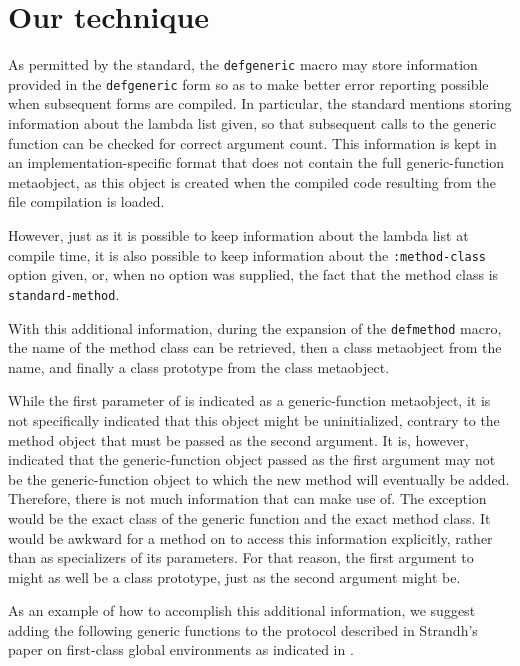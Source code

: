 \section{Our technique}

As permitted by the \commonlisp{} standard, the \texttt{defgeneric}
macro may store information provided in the \texttt{defgeneric} form
so as to make better error reporting possible when subsequent forms
are compiled.  In particular, the standard mentions storing
information about the lambda list given, so that subsequent calls to
the generic function can be checked for correct argument count.
This information is kept in an implementation-specific format that
does not contain the full generic-function metaobject, as this object
is created when the compiled code resulting from the file compilation
is loaded.

However, just as it is possible to keep information about the lambda
list at compile time, it is also possible to keep information about
the \texttt{:method-class} option given, or, when no option was
supplied, the fact that the method class is \texttt{standard-method}.

With this additional information, during the expansion of the
\texttt{defmethod} macro, the name of the method class can be
retrieved, then a class metaobject from the name, and finally a class
prototype from the class metaobject. 

While the first parameter of \mml{} is indicated as a generic-function
metaobject, it is not specifically indicated that this object might be
uninitialized, contrary to the method object that must be passed as
the second argument.  It is, however, indicated that the
generic-function object passed as the first argument may not be the
generic-function object to which the new method will eventually be
added.  Therefore, there is not much information that \mml{} can make
use of.  The exception would be the exact class of the generic
function and the exact method class.  It would be awkward for a method
on \mml{} to access this information explicitly, rather than as
specializers of its parameters.  For that reason, the first argument
to \mml{} might as well be a class prototype, just as the second
argument might be.

As an example of how to accomplish this additional information, we
suggest adding the following generic functions to the protocol
described in Strandh's paper on first-class global environments
\cite{Strandh:2015:ELS:Environments} as indicated in
.
